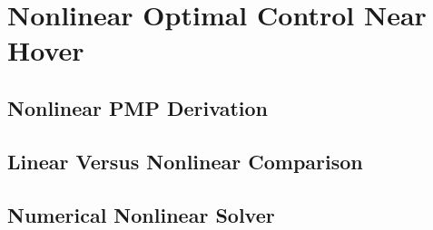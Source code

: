 \section{Nonlinear Optimal Control Near Hover}
\label{sec:part4_nonlinear}


\subsection{Nonlinear PMP Derivation}
\label{subsec:nonlinear_pmp}


\subsection{Linear Versus Nonlinear Comparison}
\label{subsec:linear_nonlinear_comparison}


\subsection{Numerical Nonlinear Solver}
\label{subsec:nonlinear_solver}

